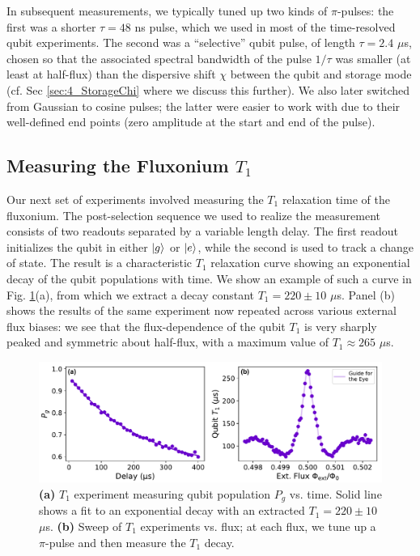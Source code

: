 In subsequent measurements, we typically tuned up two kinds of $\pi$-pulses: the first was a shorter $\tau = 48$ ns pulse, which we used in most of the time-resolved qubit experiments. The second was a ``selective'' qubit pulse, of length $\tau = 2.4$ $\mu$s, chosen so that the associated spectral bandwidth of the pulse $1/\tau$ was smaller (at least at half-flux) than the dispersive shift $\chi$ between the qubit and storage mode (cf. Sec \ref{sec:4_StorageChi} where we discuss this further). We also later switched from Gaussian to cosine pulses; the latter were easier to work with due to their well-defined end points (zero amplitude at the start and end of the pulse). 

\subsection{Measuring the Fluxonium \texorpdfstring{$T_1$}{T1}\label{sec:4_fluxonium_T1}}

Our next set of experiments involved measuring the $T_1$ relaxation time of the fluxonium. The post-selection sequence we used to realize the measurement consists of two readouts separated by a variable length delay. The first readout initializes the qubit in either $\lvert g\rangle$ or $\lvert e\rangle$, while the second is used to track a change of state. The result is a characteristic $T_1$ relaxation curve showing an exponential decay of the qubit populations with time. We show an example of such a curve in Fig. \ref{fig:4_qubit_T1_vs_flux_single}(a), from which we extract a decay constant $T_1 = 220 \pm 10$ $\mu$s. Panel (b) shows the results of the same experiment now repeated across various external flux biases: we see that the flux-dependence of the qubit $T_1$ is very sharply peaked and symmetric about half-flux, with a maximum value of $T_1 \approx 265$ $\mu$s.

\begin{figure}[h]
    \centering
    \includegraphics[width=0.95\linewidth]{Figures/4/qubit_T1_vs_flux_single.pdf}
    \caption{\textbf{(a)} $T_1$ experiment measuring qubit population $P_g$ vs. time. Solid line shows a fit to an exponential decay with an extracted $T_1 = 220 \pm 10$ $\mu$s. \textbf{(b)} Sweep of $T_1$ experiments vs. flux; at each flux, we tune up a $\pi$-pulse and then measure the $T_1$ decay.}
    \label{fig:4_qubit_T1_vs_flux_single}
\end{figure}

